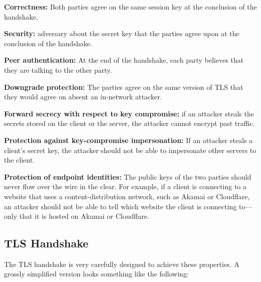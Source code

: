\begin{compactitem}
\item \textbf{Correctness:} Both parties agree on the same session key 
        at the conclusion of the handshake.
      \item \textbf{Security:} adversary  about the secret
        key that the parties agree upon at the conclusion of the handshake.
      \item \textbf{Peer authentication:} At the end of the handshake, each party believes that they are talking to the other party.
      \item \textbf{Downgrade protection:} The parties agree on the same version of TLS that they would agree on absent an in-network attacker.
      \item \textbf{Forward secrecy with respect
        to key compromise:} if an attacker
        steals the secrets stored on the client or the server, 
        the attacker cannot encrypt past traffic.
      \item \textbf{Protection against key-compromise impersonation:} If an attacker steals a client's secret key, the attacker should not be able to impersonate other servers to the client.
      \item \textbf{Protection of endpoint
        identities:} The public keys of the two
        parties should never flow over the wire in
        the clear. For example, if a client is
        connecting to a website that uses
        a content-distribution network, such as
        Akamai or Cloudflare, an attacker should
        not be able to tell which website the
        client is connecting to---only that it is
        hosted on Akamai or Cloudflare.
\end{compactitem}

\subsection{TLS Handshake}
The TLS handshake is very carefully designed to achieve these properties. A grossly simplified version looks something like the following:

